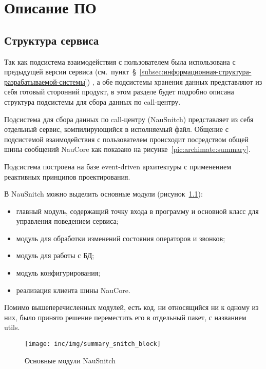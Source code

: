 \chapter{Описание ПО}
\label{ch:impl}

\section{Структура сервиса}

Так как подсистема взаимодействия с пользователем была использована
с предыдущей версии сервиса (см.~пункт~\S~\ref{subsec:информационная-структура-разрабатываемой-системы})
, а обе подсистемы хранения данных представляют из себя
готовый сторонний продукт, в этом разделе будет подробно описана
структура подсистемы для сбора данных по call-центру.

Подсистема для сбора данных по call-центру (NauSnitch) представляет из себя
отдельный сервис, компилирующийся в исполняемый файл.
Общение с подсистемой взаимодействия с пользователем
происходит посредством общей шины сообщений NauCore как показано на рисунке~\ref{pic:archimate:summary}.

Подсистема построена на базе event-driven архитектуры
с применением реактивных принципов проектирования.

В NauSnitch можно выделить основные модули (рисунок~\ref{pic:snitch:summary-block}):
\begin{itemize}
    \item главный модуль, содержащий точку входа в программу
    и основной класс для управления поведением сервиса;
    \item модуль для обработки изменений состояния операторов и звонков;
    \item модуль для работы с БД;
    \item модуль конфигурирования;
    \item реализация клиента шины NauCore.
\end{itemize}
Помимо вышеперечисленных модулей, есть код, ни относящийся ни к одному из них,
было принято решение переместить его в отдельный пакет, с названием utils.

\begin{figure}[!ht]
    \centering
    \texttt{[image: inc/img/summary\_snitch\_block]}
    \caption{Основные модули NauSnitch}
    \label{pic:snitch:summary-block}
\end{figure}

